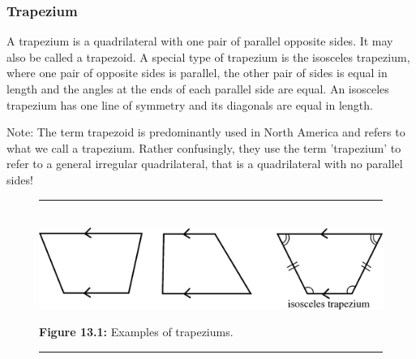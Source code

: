 \subsubsection{ Trapezium}
A trapezium is a quadrilateral with one pair of parallel opposite sides. It may also be called a trapezoid. A special type of trapezium is the isosceles trapezium, where one pair of opposite sides is parallel, the other pair of sides is equal in length and the angles at the ends of each parallel side are equal. An isosceles trapezium has one line of symmetry and its diagonals are equal in length.\par 
Note: The term trapezoid is predominantly used in North America and refers to what we call a trapezium. Rather confusingly, they use the term 'trapezium' to refer to a general irregular quadrilateral, that is a quadrilateral with no parallel sides!\par 
\setcounter{subfigure}{0}
\begin{figure}[H] %
\begin{center}
\rule[.1in]{\figurerulewidth}{.005in} \\
\label{m39354*uid55!!!underscore!!!media}\label{m39354*uid55!!!underscore!!!printimage}\includegraphics{col11306.imgs/m39354_MG10C13_040.png} %
\vspace{2pt}
\vspace{\rubberspace}\par \begin{cnxcaption}
\small \textbf{Figure 13.1: }Examples of trapeziums.
\end{cnxcaption}
\vspace{.1in}
\rule[.1in]{\figurerulewidth}{.005in} \\
\end{center}
\end{figure}       

